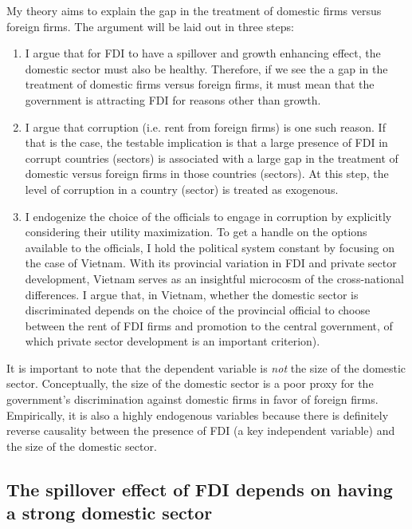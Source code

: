 My theory aims to explain the gap in the treatment of domestic firms versus foreign firms. The argument will be laid out in three steps:

\begin{enumerate}
\item I argue that for FDI to have a spillover and growth enhancing effect, the domestic sector must also be healthy. Therefore, if we see the a gap in the treatment of domestic firms versus foreign firms, it must mean that the government is attracting FDI for reasons other than growth.
\item I argue that corruption (i.e. rent from foreign firms) is one such reason. If that is the case, the testable implication is that a large presence of FDI in corrupt countries (sectors) is associated with a large gap in the treatment of domestic versus foreign firms in those countries (sectors). At this step, the level of corruption in a country (sector) is treated as exogenous.

\item I endogenize the choice of the officials to engage in corruption by explicitly considering their utility maximization. To get a handle on the options available to the officials, I hold the political system constant by focusing on the case of Vietnam. With its provincial variation in FDI and private sector development, Vietnam serves as an insightful microcosm of the cross-national differences. I argue that, in Vietnam, whether the domestic sector is discriminated depends on the choice of the provincial official to choose between the rent of FDI firms and promotion to the central government, of which private sector development is an important criterion). 
\end{enumerate}

It is important to note that the dependent variable is \textit{not} the size of the domestic sector. Conceptually, the size of the domestic sector is a poor proxy for the government's discrimination against domestic firms in favor of foreign firms. Empirically, it is also a highly endogenous variables because there is definitely reverse causality between the presence of FDI (a key independent variable) and the size of the domestic sector.

\subsection{The spillover effect of FDI depends on having a strong domestic sector}

